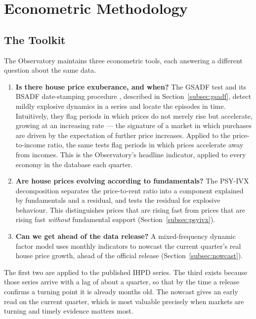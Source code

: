 \section{Econometric Methodology}
\label{sec:methodology}

\subsection{The Toolkit}

The Observatory maintains three econometric tools, each answering a different
question about the same data.

\begin{enumerate}
  \item \textbf{Is there house price exuberance, and when?} The GSADF test
        and its BSADF date-stamping procedure
        \citep{phillips2015a, phillips2015b}, described in
        Section~\ref{subsec:gsadf}, detect mildly explosive dynamics in a
        series and locate the episodes in time. Intuitively, they flag
        periods in which prices do not merely rise but accelerate, growing at
        an increasing rate --- the signature of a market in which purchases
        are driven by the expectation of further price increases. Applied to
        the price-to-income ratio, the same tests flag periods in which prices
        accelerate away from incomes. This is the Observatory's headline
        indicator, applied to every economy in the database each quarter.

  \item \textbf{Are house prices evolving according to fundamentals?} The
        PSY-IVX decomposition
        \citep{shi2021} separates the price-to-rent ratio into a component
        explained by fundamentals and a residual, and tests the residual for
        explosive behaviour. This distinguishes prices that are rising fast
        from prices that are rising fast \emph{without} fundamental support
        (Section~\ref{subsec:psyivx}).

  \item \textbf{Can we get ahead of the data release?} A mixed-frequency
        dynamic factor
        model uses monthly indicators to nowcast the current quarter's real
        house price growth, ahead of the official release
        (Section~\ref{subsec:nowcast}).
\end{enumerate}

\noindent The first two are applied to the published IHPD series. The third
exists because those series arrive with a lag of about a quarter, so that by
the time a release confirms a turning point it is already months old. The
nowcast gives an early read on the current quarter, which is most valuable
precisely when markets are turning and timely evidence matters most.

